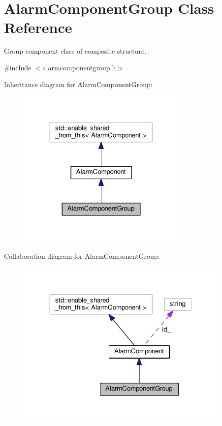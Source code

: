 \hypertarget{classAlarmComponentGroup}{}\section{Alarm\+Component\+Group Class Reference}
\label{classAlarmComponentGroup}


Group component class of composite structure.  




{\ttfamily \#include $<$alarmcomponentgroup.\+h$>$}



Inheritance diagram for Alarm\+Component\+Group\+:
\nopagebreak
\begin{figure}[H]
\begin{center}
\leavevmode
\includegraphics[width=236pt]{classAlarmComponentGroup__inherit__graph}
\end{center}
\end{figure}


Collaboration diagram for Alarm\+Component\+Group\+:
\nopagebreak
\begin{figure}[H]
\begin{center}
\leavevmode
\includegraphics[width=296pt]{classAlarmComponentGroup__coll__graph}
\end{center}
\end{figure}
